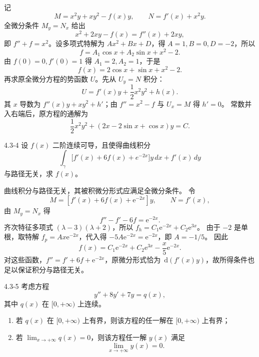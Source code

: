 \documentclass[UTF8,a4paper,11pt]{ctexart}
\newcommand{\dd}{\,\mathrm d}
\newcommand{\e}{\mathrm e}
\begin{document}
\begin{solution}
记
\[
M=x^2y+xy^2-f(x)y,\qquad N=f'(x)+x^2y.
\]
全微分条件 $M_y=N_x$ 给出
\[
x^2+2xy-f(x)=f''(x)+2xy,
\]
即 $f''+f=x^2$。设多项式特解为 $Ax^2+Bx+D$，得 $A=1,B=0,D=-2$，所以
\[
f=A_1\cos x+A_2\sin x+x^2-2.
\]
由 $f(0)=0,f'(0)=1$ 得 $A_1=2,A_2=1$，于是
\[
\boxed{f(x)=2\cos x+\sin x+x^2-2.}
\]
再求原全微分方程的势函数 $U$。先从 $U_y=N$ 积分：
\[
U=f'(x)y+\frac12x^2y^2+h(x).
\]
其 $x$ 导数为 $f''(x)y+xy^2+h'$；由 $f''=x^2-f$ 与 $U_x=M$ 得 $h'=0$。
常数并入右端后，原方程的通解为
\[
\boxed{\frac12x^2y^2+(2x-2\sin x+\cos x)y=C.}
\]
\end{solution}

\begin{problem}{4.3-4}
设 $f(x)$ 二阶连续可导，且使得曲线积分
  \[
    \int_{\gamma}\bigl[f'(x)+6f(x)+e^{-2x}\bigr]y\,dx+f'(x)\,dy
  \]
  与路径无关，求 $f(x)$。
\end{problem}

\begin{solution}
曲线积分与路径无关，其被积微分形式应满足全微分条件。
令
\[
M=[f'(x)+6f(x)+\e^{-2x}]y,\qquad N=f'(x),
\]
由 $M_y=N_x$ 得
\[
f''-f'-6f=\e^{-2x}.
\]
齐次特征多项式 $(\lambda-3)(\lambda+2)$，所以
$f_h=C_1\e^{-2x}+C_2\e^{3x}$。
由于 $-2$ 是单根，取特解 $f_p=Ax\e^{-2x}$，代入得
$-5A\e^{-2x}=\e^{-2x}$，即 $A=-1/5$。
因此
\[
\boxed{f(x)=C_1\e^{-2x}+C_2\e^{3x}-\frac{x}{5}\e^{-2x}.}
\]
对这些函数，$f''=f'+6f+\e^{-2x}$，原微分形式恰为
$\dd(f'(x)y)$，故所得条件也足以保证积分与路径无关。
\end{solution}

\begin{problem}{4.3-5}
考虑方程
  \[
    y''+8y'+7y=q(x),
  \]
  其中 $q(x)$ 在 $[0,+\infty)$ 上连续。
  \begin{enumerate}[label=(\arabic*)]
    \item 若 $q(x)$ 在 $[0,+\infty)$ 上有界，则该方程的任一解在 $[0,+\infty)$ 上有界；
    \item 若 $\displaystyle\lim_{x\to+\infty}q(x)=0$，则该方程任一解 $y(x)$ 满足
    \[
      \lim_{x\to+\infty}y(x)=0.
    \]
  \end{enumerate}
\end{problem}
\end{document}
